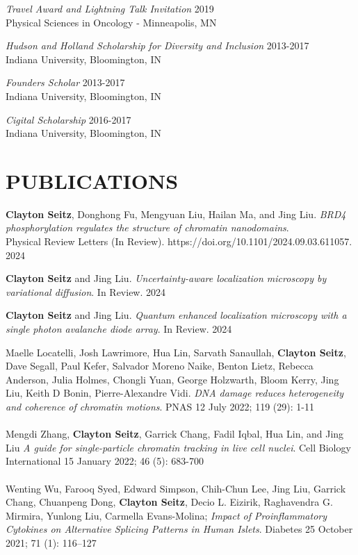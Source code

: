 \documentclass[margin, 10pt]{res} %
\begin{document}
\begin{resume}
{\sl Travel Award and Lightning Talk Invitation} \hfill 2019 \\
Physical Sciences in Oncology - Minneapolis, MN

{\sl Hudson and Holland Scholarship for Diversity and Inclusion} \hfill 2013-2017 \\
Indiana University, Bloomington, IN 

{\sl Founders Scholar} \hfill 2013-2017 \\
Indiana University, Bloomington, IN 

{\sl Cigital Scholarship} \hfill 2016-2017 \\
Indiana University, Bloomington, IN 

\section{PUBLICATIONS}

\textbf{Clayton Seitz}\textsuperscript{\textdagger}, Donghong Fu\textsuperscript{\textdagger}, Mengyuan Liu, Hailan Ma, and Jing Liu. \textit{BRD4 phosphorylation regulates the structure of chromatin nanodomains}.\\ Physical Review Letters (In Review). https://doi.org/10.1101/2024.09.03.611057. 2024

\textbf{Clayton Seitz} and Jing Liu. \textit{Uncertainty-aware localization microscopy by variational diffusion}. In Review. 2024

\textbf{Clayton Seitz} and Jing Liu. \textit{Quantum enhanced localization microscopy with a single photon avalanche diode array}. In Review. 2024

Maelle Locatelli\textsuperscript{\textdagger}, Josh Lawrimore\textsuperscript{\textdagger}, Hua Lin\textsuperscript{\textdagger}, Sarvath Sanaullah, \textbf{Clayton Seitz}, Dave Segall, Paul Kefer, Salvador Moreno Naike, Benton Lietz, Rebecca Anderson, Julia Holmes, Chongli Yuan, George Holzwarth, Bloom Kerry, Jing Liu, Keith D Bonin, Pierre-Alexandre Vidi. \textit{DNA damage reduces heterogeneity and coherence of chromatin motions}. PNAS 12 July 2022; 119 (29): 1-11
\\
\\
Mengdi Zhang, \textbf{Clayton Seitz}, Garrick Chang, Fadil Iqbal, Hua Lin, and Jing Liu \textit{A guide for single-particle chromatin tracking in live cell nuclei}. Cell Biology International 15 January 2022; 46 (5): 683-700
\\
\\
Wenting Wu, Farooq Syed, Edward Simpson, Chih-Chun Lee, Jing Liu, Garrick Chang, Chuanpeng Dong, \textbf{Clayton Seitz}, Decio L. Eizirik, Raghavendra G. Mirmira, Yunlong Liu, Carmella Evans-Molina; \textit{Impact of Proinflammatory Cytokines on Alternative Splicing Patterns in Human Islets}. Diabetes 25 October 2021; 71 (1): 116–127


\end{resume}
\end{document}
